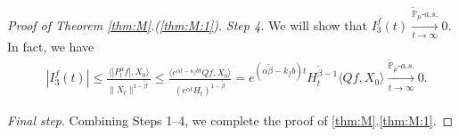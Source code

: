 \documentclass[12pt,a4paper]{amsart}
\theoremstyle{plain}
\theoremstyle{definition}
\numberwithin{equation}{section}
\begin{document}
\begin{proof}[Proof of Theorem \ref{thm:M}.(\ref{thm:M:1})]
	\emph{Step 4.} We will show that $I^f_3(t) \xrightarrow[t\to \infty]{\widetilde {\mathbb P}_\mu \text{-} a.s.} 0$.
  In fact, we have
  \begin{align}
    & |I^f_3(t)|
      \leq \frac{\langle |P^\alpha_tf|,X_0\rangle}{\|X_t\|^{1 - \tilde \beta }}
      \leq \frac{\langle e^{\alpha t - \kappa_f b t}Qf,X_0\rangle}{(e^{\alpha t} H_t)^{1 - \tilde \beta}}
      = e^{(\alpha \tilde \beta - k_fb)t} H_t^{\tilde \beta - 1} \langle Qf,X_0\rangle
      \xrightarrow[t\to \infty]{\widetilde {\mathbb P}_\mu \text{-} a.s.} 0.
  \end{align}

\emph{Final step}. Combining Steps 1--4, we complete the proof of \ref{thm:M}.\eqref{thm:M:1}.
\end{proof}

\end{document}
